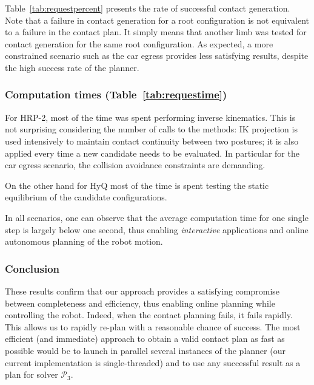 \documentclass[journal]{IEEEtran}
\newcommand{\gls}[1]{\textit{#1}}
\begin{document}
Table~\ref{tab:requestpercent} presents the rate of successful contact generation. Note that a failure in contact generation for a root configuration is not equivalent to a failure in the contact plan. It simply means that another limb was tested for contact generation for the same root configuration.
As expected, a more constrained scenario such as the car egress provides less satisfying results, despite the high success rate of the planner.

\subsubsection{Computation times (Table~\ref{tab:requestime})}

For HRP-2, most of the time was spent performing inverse kinematics.
This is not surprising considering the number of calls to the methods: IK projection is used intensively to maintain contact continuity between two postures; 
it is also applied every time a new candidate needs to be evaluated. In particular for the car egress scenario,
the collision avoidance constraints are demanding.

On the other hand for HyQ most of the time is spent testing the static equilibrium of the candidate configurations.

In all scenarios, one can observe that the average computation time for one single step is largely below one second,
thus enabling \gls{interactive} applications and online autonomous planning of the robot motion.

\subsubsection*{Conclusion}
These results confirm that our approach provides a satisfying compromise between completeness and efficiency, thus enabling online planning
while controlling the robot. Indeed, when the contact planning fails, it fails rapidly. This allows us to rapidly re-plan with a reasonable chance of success.
The most efficient (and immediate) approach to obtain a valid contact plan as fast as possible would be to launch in parallel several instances of the planner (our current implementation is single-threaded) and to use any successful result as a plan for solver $\mathcal{P}_3$.
\end{document}
